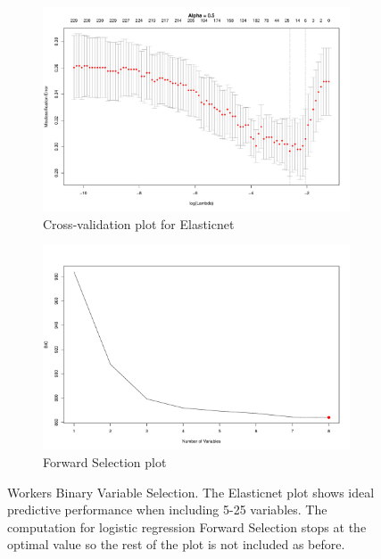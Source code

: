 \documentclass{article}
\begin{document}
\begin{figure}[h]
\begin{subfigure}[b]{0.5\textwidth}
\includegraphics[width=\textwidth]{elastic_cv_workers_binary.pdf}
\caption{Cross-validation plot for Elasticnet}
\end{subfigure}
\hfill
\begin{subfigure}[b]{0.5\textwidth}
\includegraphics[width=\textwidth]{forward_nvars_workers_binary.pdf}
\caption{Forward Selection plot}
\end{subfigure}
\caption{Workers Binary Variable Selection. The Elasticnet plot shows ideal predictive performance when including 5-25 variables. The computation for logistic regression Forward Selection stops at the optimal value so the rest of the plot is not included as before.}
\label{figure:workers_binary_opt}
\end{figure}
\end{document}
